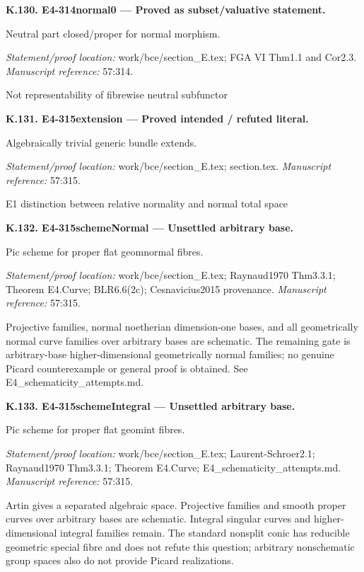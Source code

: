 \par\medskip\noindent\textbf{K.130. E4-314normal0 --- Proved as subset/valuative statement.}\par
Neutral part closed/proper for normal morphism.
\par\emph{Statement/proof location:} work/bce/section\_E.tex; FGA VI Thm1.1 and Cor2.3.
\emph{Manuscript reference:} 57:314.
\par Not representability of fibrewise neutral subfunctor
\par\medskip\noindent\textbf{K.131. E4-315extension --- Proved intended / refuted literal.}\par
Algebraically trivial generic bundle extends.
\par\emph{Statement/proof location:} work/bce/section\_E.tex; section.tex.
\emph{Manuscript reference:} 57:315.
\par E1 distinction between relative normality and normal total space
\par\medskip\noindent\textbf{K.132. E4-315schemeNormal --- Unsettled arbitrary base.}\par
Pic scheme for proper flat geomnormal fibres.
\par\emph{Statement/proof location:} work/bce/section\_E.tex; Raynaud1970 Thm3.3.1; Theorem E4.Curve; BLR6.6(2c); Cesnavicius2015 provenance.
\emph{Manuscript reference:} 57:315.
\par Projective families, normal noetherian dimension-one bases, and all geometrically normal curve families over arbitrary bases are schematic. The remaining gate is arbitrary-base higher-dimensional geometrically normal families; no genuine Picard counterexample or general proof is obtained. See E4\_schematicity\_attempts.md.
\par\medskip\noindent\textbf{K.133. E4-315schemeIntegral --- Unsettled arbitrary base.}\par
Pic scheme for proper flat geomint fibres.
\par\emph{Statement/proof location:} work/bce/section\_E.tex; Laurent-Schroer2.1; Raynaud1970 Thm3.3.1; Theorem E4.Curve; E4\_schematicity\_attempts.md.
\emph{Manuscript reference:} 57:315.
\par Artin gives a separated algebraic space. Projective families and smooth proper curves over arbitrary bases are schematic. Integral singular curves and higher-dimensional integral families remain. The standard nonsplit conic has reducible geometric special fibre and does not refute this question; arbitrary nonschematic group spaces also do not provide Picard realizations.
